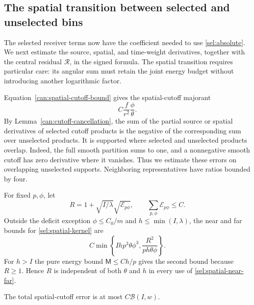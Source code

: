 \subsection{The spatial transition between selected and unselected bins}

The selected receiver terms now have the coefficient needed to use
\eqref{sel:absolute}. We next estimate the source, spatial, and
time-weight derivatives, together with the central residual
$\mathcal R$, in the signed formula. The spatial transition requires
particular care: its angular sum must retain the joint energy budget
without introducing another logarithmic factor.

Equation~\eqref{can:spatial-cutoff-bound} gives the spatial-cutoff majorant
\begin{equation}\label{sel:spatial-kernel}
 C\frac{f}{r^2}\frac\phi\theta.
\end{equation}
By Lemma~\ref{can:cutoff-cancellation}, the sum of the partial source or spatial derivatives of selected cutoff
products is the negative of the corresponding sum over unselected
products. It is supported where selected and unselected products overlap.
Indeed, the full smooth partition sums to one, and a nonnegative smooth
cutoff has zero derivative where it vanishes. Thus we estimate these
errors on overlapping unselected supports. Neighboring representatives
have ratios bounded by four.

For fixed $p,\phi$, let
\begin{equation}\label{sel:R}
 R=1+\sqrt{I/\lambda}\sqrt{\mathcal E_{p\phi}},
 \qquad \sum_{p,\phi}\mathcal E_{p\phi}\le C.
\end{equation}
Outside the deficit exception $\phi\le C_0/m$ and
$h\le\min(I,\lambda)$, the near and far
bounds for \eqref{sel:spatial-kernel} are
\begin{equation}\label{sel:spatial-near-far}
 C\min\left\{Ihp^3\theta\phi^3,
                 \frac{R^2}{ph\theta\phi}\right\}.
\end{equation}
For $h>I$ the pure energy bound $\mathsf M\le Ch/p$ gives the second
bound because $R\ge1$. Hence $R$ is independent of both $\theta$ and $h$
in every use of \eqref{sel:spatial-near-far}.

\begin{lemma}\label{sel:spatial-sum}
The total spatial-cutoff error is at most $C\mathcal B(I,w)$.
\end{lemma}

